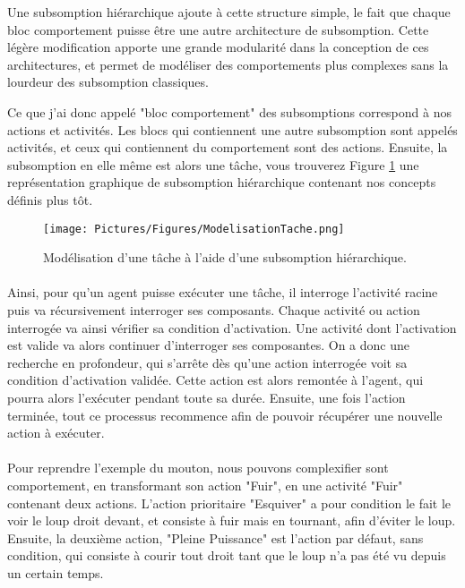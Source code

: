 \documentclass[11pt,a4paper]{report}
\begin{document}
			Une subsomption hiérarchique ajoute à cette structure simple, le fait que chaque bloc comportement puisse être une autre architecture de subsomption. Cette légère modification apporte une grande modularité dans la conception de ces architectures, et permet de modéliser des comportements plus complexes sans la lourdeur des subsomption classiques.
			
			Ce que j'ai donc appelé "bloc comportement" des subsomptions correspond à nos actions et activités. Les blocs qui contiennent une autre subsomption sont appelés activités, et ceux qui contiennent du comportement sont des actions. Ensuite, la subsomption en elle même est alors une tâche, vous trouverez Figure \ref{ModelisationTache} une représentation graphique de subsomption hiérarchique contenant nos concepts définis plus tôt.
			
			\begin{figure}
			\centering
			\texttt{[image: Pictures/Figures/ModelisationTache.png]}
			\caption{Modélisation d'une tâche à l'aide d'une subsomption hiérarchique.}
			\label{ModelisationTache}
			\end{figure}
		\paragraph{}
			Ainsi, pour qu'un agent puisse exécuter une tâche, il interroge l'activité racine puis va récursivement interroger ses composants. Chaque activité ou action interrogée va ainsi vérifier sa condition d'activation. Une activité dont l'activation est valide va alors continuer d'interroger ses composantes. On a donc une recherche en profondeur, qui s'arrête dès qu'une action interrogée voit sa condition d'activation validée. Cette action est alors remontée à l'agent, qui pourra alors l'exécuter pendant toute sa durée. Ensuite, une fois l'action terminée, tout ce processus recommence afin de pouvoir récupérer une nouvelle action à exécuter.
			
			\paragraph{}
			Pour reprendre l'exemple du mouton, nous pouvons complexifier sont comportement, en transformant son action "Fuir", en une activité "Fuir" contenant deux actions. L'action prioritaire "Esquiver" a pour condition le fait le voir le loup droit devant, et consiste à fuir mais en tournant, afin d'éviter le loup. Ensuite, la deuxième action, "Pleine Puissance" est l'action par défaut, sans condition, qui consiste à courir tout droit tant que le loup n'a pas été vu depuis un certain temps.
			
\end{document}

